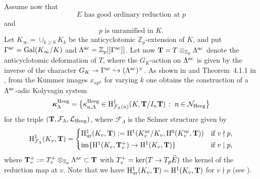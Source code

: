 \documentclass[10pt,reqno]{amsart}
\numberwithin{equation}{section}
\theoremstyle{plain}
\theoremstyle{definition}
\theoremstyle{definition}
\theoremstyle{plain}
\theoremstyle{plain}
\theoremstyle{plain}
\theoremstyle{plain}
\theoremstyle{plain}
\theoremstyle{plain}
\newcommand{\Tac}{\mathbf{T}}
\newcommand{\Z}{\mathbb{Z}}
\newcommand{\F}{\mathcal{F}}
\newcommand{\Lcal}{\mathcal{L}}
\newcommand{\Fcal}{\mathcal{F}}
\newcommand{\rH}{\mathrm{H}}
\begin{document}
Assume now that 
\begin{equation}\label{eq:ord}
\textrm{$E$ has good ordinary reduction at $p$}\tag{ord}
\end{equation}
and
\begin{equation}\label{eq:unr}
\textrm{$p$ is unramified in $K$.}\tag{unr}
\end{equation}
Let $K_\infty=\cup_{k\geq 0}K_k$ 
be the anticyclotomic $\Z_p$-extension of $K$, and put $\Gamma^{\rm ac}={\rm Gal}(K_\infty/K)$ and $\Lambda^{\rm ac}=\Z_p[[\Gamma^{\rm ac}]]$. Let now $\Tac=T\otimes_{\Z_p}\Lambda^{\rm ac}$ denote the anticyclotomic deformation of $T$, where the $G_K$-action on $\Lambda^{\rm ac}$ is given by the inverse of the character $G_K\twoheadrightarrow\Gamma^{\rm ac}\hookrightarrow(\Lambda^{\rm ac})^\times$. As shown in \cite[\S{2.3}]{howard} and Theorem~4.1.1 %
in \cite{eisenstein}, from the Kummer images $x_{np^k}$  for varying $k$ one obtains the construction of a $\Lambda^{\rm ac}$-adic Kolyvagin system
\[
\boldsymbol{\kappa}_\Lambda^{\rm Heeg}=\big\{\kappa_{n,\Lambda}^{\rm Heeg}\in\rH^1_{\Fcal_\Lambda(n)}(K,\Tac/I_n\Tac)\;\colon\;n\in\mathcal{N}_{\rm Heeg}\big\}
\]
for the triple $(\Tac,\Fcal_\Lambda,\Lcal_{\rm Heeg})$, where $\F_\Lambda$ is the Selmer structure  given by
\[
\rH^1_{\Fcal_\Lambda}(K_v,\Tac)=
\begin{cases}
\rH^1_{\rm ur}(K_v,\Tac):=\rH^1(K_v^{\rm ur}/K_v,\rH^0(K_v^{\rm ur},\Tac))&\textrm{if $v\nmid p$,}\\[0.2em]
{\rm im}\{\rH^1(K_v,\Tac_v^+)\rightarrow\rH^1(K_v,\Tac)\}&\textrm{if $v\mid p$,}
\end{cases}
\]
where $\Tac_v^+:=T_v^+\otimes_{\Z_p}\Lambda^{\rm ac}\subset\Tac$ with $T_v^+={\rm ker}(T\rightarrow T_p\widetilde{E})$ the kernel of the reduction map at $v$. Note that we have $\rH^1_{\rm ur}(K_v,\Tac)=\rH^1(K_v,\Tac)$ for $v \nmid p$ (see \cite[Lem. 5.3.1(ii)]{mazrub}).
\end{document}
